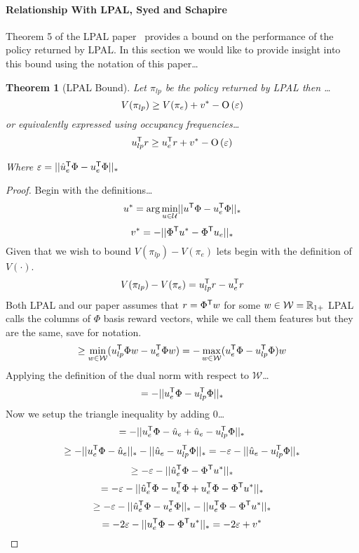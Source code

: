 \documentclass[11pt]{article}
\newtheorem{theorem}{Theorem}
\begin{document}
\paragraph{Relationship With LPAL, Syed and Schapire~\cite{Syed2008}}

Theorem 5 of the LPAL paper~\cite{Syed2008} provides a bound on the performance of the policy returned by LPAL. 
In this section we would like to provide insight into this bound using the notation of this paper\dots

\begin{theorem}[LPAL Bound]
	Let $\pi_{lp}$ be the policy returned by LPAL then \dots
	\[V(\pi_{lp}) \geq V(\pi_e) + v^* - \mbox{O}\left(\varepsilon\right)\]
	or equivalently expressed using occupancy frequencies\dots
	\[u_{lp}^{\mathsf{T}} r \geq u_e^{\mathsf{T}} r + v^* - \mbox{O}\left(\varepsilon\right)\]

	Where $\varepsilon = \lvert\lvert \hat{u}_e^{\mathsf{T}} \Phi - u_e^{\mathsf{T}} \Phi\rvert\rvert_*$
\end{theorem}

\begin{proof}
	Begin with the definitions\dots
	\[
		u^* = \arg\min_{u \in \mathcal{U}} \lvert\lvert u^{\mathsf{T}} \Phi - u_e^{\mathsf{T}} \Phi \rvert\rvert_*
	\]
	\[
		v^* = - \lvert\lvert \Phi^{\mathsf{T}} u^* - \Phi^{\mathsf{T}} u_e \rvert\rvert_*
	\]
	Given that we wish to bound $V(\pi_{lp}) - V(\pi_e)$ lets begin with the definition of $V(\cdot)$.
	\[V(\pi_{lp}) - V(\pi_e) = u_{lp}^{\mathsf{T}} r - u_e^{\mathsf{T}} r\]
	Both LPAL and our paper assumes that $r = \Phi^{\mathsf{T}} w$ for some $w \in \mathcal{W} = \mathbb{R}_{1+}$ LPAL calls the columns of $\Phi$ basis
	reward vectors, while we call them features but they are the same, save for notation.
	\[\geq \min_{w \in \mathcal{W}}(u_{lp}^{\mathsf{T}} \Phi w - u_e^{\mathsf{T}} \Phi w) =- \max_{w \in \mathcal{W}}(u_e^{\mathsf{T}} \Phi - u_{lp}^{\mathsf{T}} \Phi)w \]
	Applying the definition of the dual norm with respect to $\mathcal{W}$\dots
	\[= -\lvert\lvert u_e^{\mathsf{T}} \Phi - u_{lp}^{\mathsf{T}} \Phi \rvert\rvert_*\]
	Now we setup the triangle inequality by adding 0\dots
	\[= -\lvert\lvert u_e^{\mathsf{T}} \Phi - \hat{u}_e + \hat{u}_e - u_{lp}^{\mathsf{T}} \Phi \rvert\rvert_*\]
	\[\geq -\lvert\lvert u_e^{\mathsf{T}} \Phi - \hat{u}_e\rvert\rvert_* - \lvert\lvert \hat{u}_e - u_{lp}^{\mathsf{T}} \Phi \rvert\rvert_* = -\varepsilon - \lvert\lvert \hat{u}_e - u_{lp}^{\mathsf{T}} \Phi \rvert\rvert_* \]
	\[\geq -\varepsilon - \lvert\lvert \hat{u}_e^{\mathsf{T}} \Phi - \Phi^{\mathsf{T}} u^*\rvert\rvert_*\]
	\[= -\varepsilon - \lvert\lvert \hat{u}_e^{\mathsf{T}} \Phi - u_e^{\mathsf{T}}\Phi + u_e^{\mathsf{T}}\Phi - \Phi^{\mathsf{T}} u^*\rvert\rvert_*\]
	\[\geq -\varepsilon - \lvert\lvert \hat{u}_e^{\mathsf{T}} \Phi - u_e^{\mathsf{T}}\Phi\rvert\rvert_* - \lvert\lvert u_e^{\mathsf{T}}\Phi - \Phi^{\mathsf{T}} u^*\rvert\rvert_*\]
	\[= -2\varepsilon - \lvert\lvert u_e^{\mathsf{T}}\Phi - \Phi^{\mathsf{T}} u^*\rvert\rvert_* = -2\varepsilon + v^*\]
\end{proof}
\end{document}
